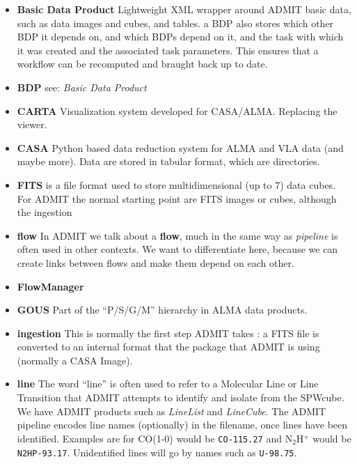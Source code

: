 \documentclass[preprint]{aastex}
\begin{document}
\begin{itemize}
\item {\bf Basic Data Product}
Lightweight XML wrapper around ADMIT basic data, such as data images and cubes, and tables. a BDP also
stores which other BDP it depends on, and which BDPs depend on it, and the task with which it was
created and the associated task parameters. This ensures that a workflow can be recomputed and braught
back up to date.

\item {\bf BDP}
see: {\it Basic Data Product}

\item {\bf CARTA}
Visualization system developed for CASA/ALMA. Replacing the viewer.

\item {\bf CASA}
Python based data reduction system for ALMA and VLA data (and maybe more). Data are stored
in tabular format, which are directories.

\item {\bf FITS}
is a file format used to store multidimensional (up to 7) data cubes. For ADMIT
the normal starting point are FITS images or cubes, although the ingestion

\item {\bf flow}
In ADMIT we talk about a {\bf flow}, much in the same way as {\it pipeline} is 
often used in other contexts. We want to differentiate here, because we can create
links between flows and make them depend on each other.

\item {\bf FlowManager}

\item {\bf GOUS}  Part of the ``P/S/G/M'' hierarchy in ALMA data products.

\item {\bf ingestion}
This is normally the first step ADMIT takes : a FITS file is converted to an internal format
that the package that ADMIT is using (normally a CASA Image).

\item {\bf line}
The word ``line'' is often used to refer to a Molecular Line or Line Transition
that ADMIT attempts to identify and isolate from the SPWcube.
We have ADMIT products such as {\it LineList} and {\it LineCube}.
The ADMIT pipeline encodes line names (optionally) in the filename, once lines have 
been identified.  Examples are for CO(1-0) would be {\tt CO-115.27} and 
N$_2$H$^+$ would be {\tt N2HP-93.17}. Unidentified lines will go by
names such as {\tt U-98.75}.



\end{itemize}
\end{document}

